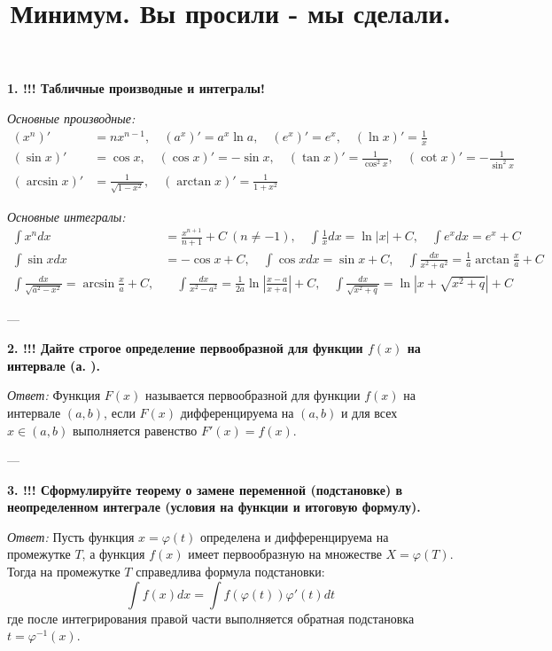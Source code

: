 \documentclass{article}
\title{Минимум. Вы просили - мы сделали.}
\date{}
\begin{document}
\maketitle

\textbf{1. !!! Табличные производные и интегралы!}

\textit{Основные производные:}
\begin{align*}
(x^n)' &= n x^{n-1}, \quad (a^x)' = a^x \ln a, \quad (e^x)' = e^x, \quad (\ln x)' = \frac{1}{x} \\
(\sin x)' &= \cos x, \quad (\cos x)' = -\sin x, \quad (\tan x)' = \frac{1}{\cos^2 x}, \quad (\cot x)' = -\frac{1}{\sin^2 x} \\
(\arcsin x)' &= \frac{1}{\sqrt{1-x^2}}, \quad (\arctan x)' = \frac{1}{1+x^2}
\end{align*}

\textit{Основные интегралы:}
\begin{align*}
\int x^n dx &= \frac{x^{n+1}}{n+1} + C \ (n \neq -1), \quad \int \frac{1}{x} dx = \ln|x| + C, \quad \int e^x dx = e^x + C \\
\int \sin x dx &= -\cos x + C, \quad \int \cos x dx = \sin x + C, \quad \int \frac{dx}{x^2+a^2} = \frac{1}{a} \arctan \frac{x}{a} + C \\
\int \frac{dx}{\sqrt{a^2-x^2}} = \arcsin \frac{x}{a} + C, &\quad \int \frac{dx}{x^2-a^2} = \frac{1}{2a} \ln\left|\frac{x-a}{x+a}\right| + C, \quad \int \frac{dx}{\sqrt{x^2+q}} = \ln\left|x + \sqrt{x^2+q}\right| + C
\end{align*}

---

\textbf{2. !!! Дайте строгое определение первообразной для функции $f(x)$ на интервале (а. ).}

\textit{Ответ:} Функция $F(x)$ называется первообразной для функции $f(x)$ на интервале $(a, b)$, если $F(x)$ дифференцируема на $(a, b)$ и для всех $x \in (a, b)$ выполняется равенство $F'(x) = f(x)$.

---

\textbf{3. !!! Сформулируйте теорему о замене переменной (подстановке) в неопределенном интеграле (условия на функции и итоговую формулу).}

\textit{Ответ:} Пусть функция $x = \varphi(t)$ определена и дифференцируема на промежутке $T$, а функция $f(x)$ имеет первообразную на множестве $X = \varphi(T)$. Тогда на промежутке $T$ справедлива формула подстановки:
$$ \int f(x) dx = \int f(\varphi(t)) \varphi'(t) dt $$
где после интегрирования правой части выполняется обратная подстановка $t = \varphi^{-1}(x)$.
\end{document}
